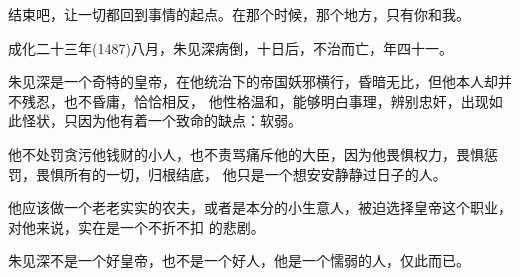 \documentclass[11pt,a4paper,onecolumn]{article}
\begin{document}
结束吧，让一切都回到事情的起点。在那个时候，那个地方，只有你和我。

成化二十三年(1487)八月，朱见深病倒，十日后，不治而亡，年四十一。

朱见深是一个奇特的皇帝，在他统治下的帝国妖邪横行，昏暗无比，但他本人却并不残忍，也不昏庸，恰恰相反，
他性格温和，能够明白事理，辨别忠奸，出现如此怪状，只因为他有着一个致命的缺点：软弱。

他不处罚贪污他钱财的小人，也不责骂痛斥他的大臣，因为他畏惧权力，畏惧惩罚，畏惧所有的一切，归根结底，
他只是一个想安安静静过日子的人。

他应该做一个老老实实的农夫，或者是本分的小生意人，被迫选择皇帝这个职业，对他来说，实在是一个不折不扣
的悲剧。

朱见深不是一个好皇帝，也不是一个好人，他是一个懦弱的人，仅此而已。
\end{document}
